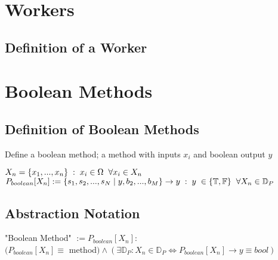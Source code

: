 \documentclass[11pt]{article}
\begin{document}
\section{Workers}
\subsection{Definition of a Worker}





\newpage

\section{Boolean Methods}
\subsection{Definition of Boolean Methods}
Define a boolean method; a method with inputs $x_i$ and boolean output $y$
\begin{center}
$
X_n = \{x_1,...,x_n\} \hspace{1mm} : \hspace{1mm} x_i \in \Omega \hspace{2mm} \forall x_i \in X_n
$
\\ \vspace{2mm}
$
P_{boolean}\lbrack X_n \rbrack := \{ s_1,s_2,...,s_{N}\hspace{1mm}|\hspace{1mm} y, b_2,...,b_M\} \rightarrow y \hspace{1mm} : \hspace{1mm} y \hspace{1mm} \in  \{\mathbb{T},\mathbb{F}\} \hspace{2mm} \forall X_n \in \mathbb{D}_{P}
$
\end{center}

\subsection{Abstraction Notation}
\begin{center}
"Boolean Method" $:= P_{boolean}[X_n]:
$
\\ \vspace{2mm}
$
(P_{boolean}[X_n] \equiv $ method$) \land (\exists \mathbb{D}_P : X_n \in \mathbb{D}_P \Leftrightarrow P_{boolean}[X_n] \rightarrow y \equiv bool) 
$
\end{center}
\end{document}
